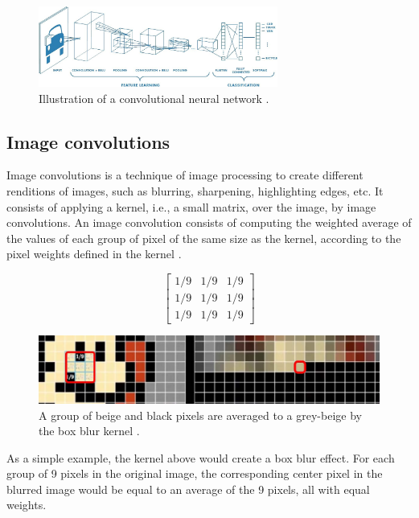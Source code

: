 \documentclass[12pt,a4paper,notitlepage]{article}
\begin{document}
\begin{figure}[htbp]
	\centering
		\includegraphics[width=0.70\textwidth]{images/convolutional-neural-network.jpeg}
	\caption{Illustration of a convolutional neural network \cite{saha_comprehensive_2018}.}
	\label{fig:convolutional-neural-network}
\end{figure}

\subsection{Image convolutions}
Image convolutions is a technique of image processing to create different renditions of images, such as blurring, sharpening, highlighting edges, etc. It consists of applying a kernel, i.e., a small matrix, over the image, by image convolutions. An image convolution consists of computing the weighted average of the values of each group of pixel of the same size as the kernel, according to the pixel weights defined in the kernel \cite{sanderson_convolutions_2020}.

\begin{displaymath}
	\begin{bmatrix}
		1/9 & 1/9 & 1/9 \\
		1/9 & 1/9 & 1/9 \\
		1/9 & 1/9 & 1/9
	\end{bmatrix}
\end{displaymath}

\begin{figure}[htbp]
	\centering
		\includegraphics[width=1.00\textwidth]{images/box-blur.jpg}
	\caption{A group of beige and black pixels are averaged to a grey-beige by the box blur kernel \cite{sanderson_convolutions_2020}.}
	\label{fig:box-blur}
\end{figure}

As a simple example, the kernel above would create a box blur effect. For each group of 9 pixels in the original image, the corresponding center pixel in the blurred image would be equal to an average of the 9 pixels, all with equal weights.
\end{document}
